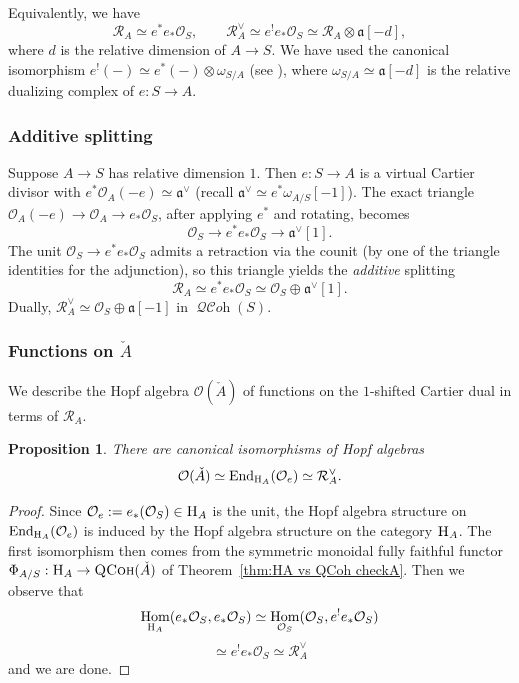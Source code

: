 \documentclass[12pt, oneside]{amsart}
\numberwithin{equation}{section}
\newtheorem{proposition}[subsubsection]{Proposition}
\theoremstyle{remark}
\theoremstyle{plain}
\DeclareMathOperator{\QCoh}{\textsc{QCoh}}
\DeclareMathOperator{\QCOH}{\mathcal{QC}\textit{oh}}
\newcommand{\Hcat}{\textup{\textsc{H}}}
\newcommand{\HA}{\Hcat_A}
\DeclareMathOperator{\Hom}{Hom}
\newcommand{\R}{\mathcal{R}}
\newcommand{\RA}{\R_A}
\newcommand{\fra}{\mathfrak{a}}
\newcommand{\frav}{\mathfrak{a}^\vee}
\newcommand{\OO}{\mathcal{O}}
\begin{document}
\subsubsection{}
Equivalently, we have
\[ \RA \simeq e^*e_*\OO_S, \qquad \RA^\vee \simeq e^!e_*\OO_S \simeq \RA \otimes \fra[-d], \]
where $d$ is the relative dimension of $A \to S$.
We have used the canonical isomorphism $e^!(-) \simeq e^*(-) \otimes \omega_{S/A}$ (see \cite[Cor.~6.4.2.7]{SAG}), where $\omega_{S/A} \simeq \fra[-d]$ is the relative dualizing complex of $e : S \to A$.

\subsubsection{Additive splitting}\label{sssec:funcheckA add split}

Suppose $A \to S$ has relative dimension $1$.
Then $e : S \to A$ is a virtual Cartier divisor with $e^*\OO_A(-e) \simeq \frav$ (recall $\frav \simeq e^*\omega_{A/S}[-1]$).
The exact triangle $\OO_A(-e) \to \OO_A \to e_*\OO_S$, after applying $e^*$ and rotating, becomes
$$ \OO_S \longrightarrow e^*e_*\OO_S \longrightarrow \frav[1]. $$
The unit $\OO_S \to e^*e_*\OO_S$ admits a retraction via the counit (by one of the triangle identities for the adjunction), so this triangle yields the \emph{additive} splitting
$$\RA \simeq e^*e_*\OO_S \simeq \OO_S \oplus \frav[1].$$
Dually, $\RA^\vee \simeq \OO_S \oplus \fra[-1]$ in $\QCOH(S)$.

\subsubsection{Functions on \texorpdfstring{$\check{A}$}{Ǎ}}\label{sssec:funcheckA}

We describe the Hopf algebra $\OO(\check{A})$ of functions on the $1$-shifted Cartier dual in terms of $\RA$.

\begin{proposition} \label{prop:fun check A}
  There are canonical isomorphisms of Hopf algebras
  \[
    \OO(\check{A})
    \simeq \operatorname{End}_{\HA}(\OO_{e})
    \simeq \RA^\vee.
  \]
\end{proposition}

\begin{proof}
Since $\OO_{e} := e_*(\OO_S) \in \HA$ is the unit, the Hopf algebra structure on $\operatorname{End}_{\HA}(\OO_{e})$ is induced by the Hopf algebra structure on the category $\HA$.
The first isomorphism then comes from the symmetric monoidal fully faithful functor $\Phi_{A/S} : \HA \to \QCoh(\check{A})$ of Theorem~\ref{thm:HA vs QCoh checkA}.
Then we observe that
$$ \Hom_{\HA}(e_*\OO_S, e_*\OO_S) \simeq \Hom_{\OO_S}(\OO_S,e^!e_*\OO_S)$$ $$\simeq e^!e_*\OO_S \simeq \RA^\vee$$ and we are done.
\end{proof}
\end{document}
